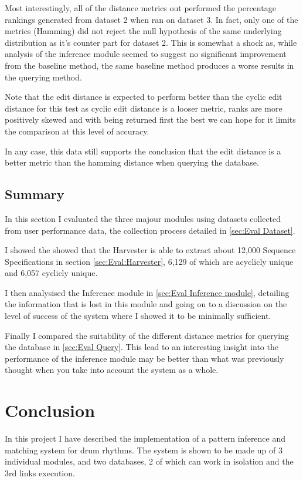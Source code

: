 \documentclass[12pt,twoside,notitlepage]{report}
\begin{document}
				Most interestingly, all of the distance metrics out performed the percentage rankings generated from dataset 2 when ran on dataset 3. In fact, only one of the metrics (Hamming) did not reject the null hypothesis of the same underlying distribution as it's counter part for dataset 2. This is somewhat a shock as, while analysis of the inference module seemed to suggest no significant improvement from the baseline method, the same baseline method produces a worse results in the querying method.
				
				Note that the edit distance is expected to perform better than the cyclic edit distance for this test as cyclic edit distance is a looser metric, ranks are more positively skewed and with being returned first the best we can hope for it limits the comparison at this level of accuracy.				
				
				In any case, this data still supports the conclusion that the edit distance is a better metric than the hamming distance when querying the database.
				
				
		\section{Summary}
		In this section I evaluated the three majour modules using datasets collected from user performance data, the collection process detailed in \ref{sec:Eval Dataset}.
		
		I showed the showed that the Harvester is able to extract about 12,000 Sequence Specifications in section \ref{sec:Eval:Harvester}, 6,129 of which are acyclicly unique and 6,057 cyclicly unique.
		
		I then analysised the Inference module in \ref{sec:Eval Inference module}, detailing the information that is lost in this module and going on to a discussion on the level of success of the system where I showed it to be minimally sufficient.
		
		Finally I compared the suitability of the different distance metrics for querying the database in \ref{sec:Eval Query}. This lead to an interesting insight into the performance of the inference module may be better than what was previously thought when you take into account the system as a whole. 
	
\cleardoublepage
\chapter{Conclusion}
In this project I have described the implementation of a pattern inference and matching system for drum rhythms. The system is shown to be made up of 3 individual modules, and two databases, 2 of which can work in isolation and the 3rd links execution.
\end{document}
